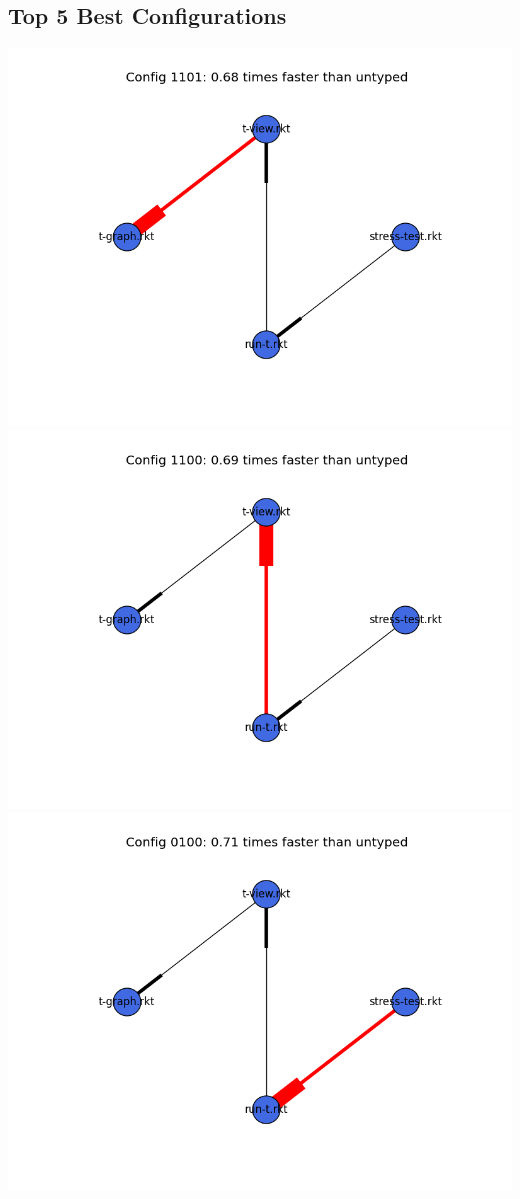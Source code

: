 \documentclass{article}
\begin{document}
\begin{itemize}
\subsection{Top 5 Best Configurations}
\includegraphics[width=\textwidth]{mbta-ben-module-graph-1101.png}
\includegraphics[width=\textwidth]{mbta-ben-module-graph-1100.png}
\includegraphics[width=\textwidth]{mbta-ben-module-graph-0100.png}

\end{itemize}
\end{document}
